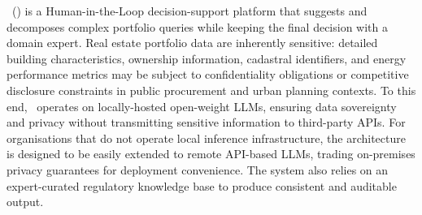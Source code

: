 \documentclass[runningheads,orivec]{llncs}
\begin{document}
\methodACR\ (\method) is a Human-in-the-Loop decision-support platform that suggests and decomposes complex portfolio queries while keeping the final decision with a domain expert.
Real estate portfolio data are inherently sensitive: detailed building characteristics, ownership information, cadastral identifiers, and energy performance metrics may be subject to confidentiality obligations or competitive disclosure constraints in public procurement and urban planning contexts.
To this end, \methodACR\ operates on locally-hosted open-weight LLMs, ensuring data sovereignty and privacy without transmitting sensitive information to third-party APIs.
For organisations that do not operate local inference infrastructure, the architecture is designed to be easily extended to remote API-based LLMs, trading on-premises privacy guarantees for deployment convenience.
The system also relies on an expert-curated regulatory knowledge base to produce consistent and auditable output.
\end{document}
